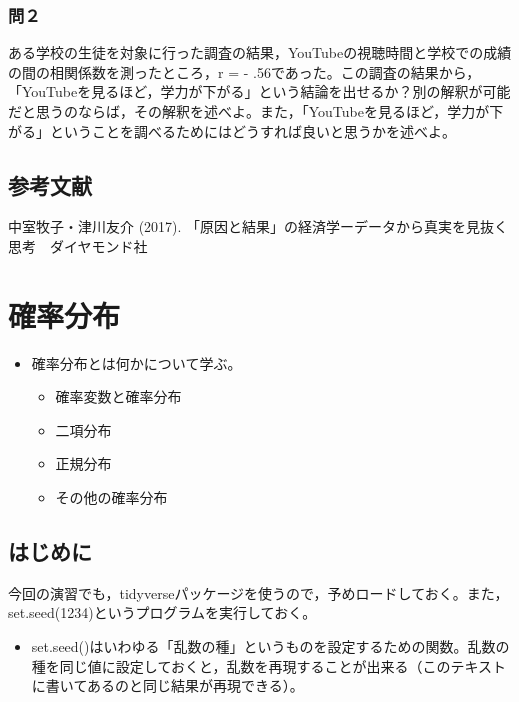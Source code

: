 \documentclass[]{article}
\providecommand{\tightlist}{%
  \setlength{\itemsep}{0pt}\setlength{\parskip}{0pt}}
\begin{document}
\subsubsection{問２}\label{-7}

ある学校の生徒を対象に行った調査の結果，YouTubeの視聴時間と学校での成績の間の相関係数を測ったところ，r
= -
.56であった。この調査の結果から，「YouTubeを見るほど，学力が下がる」という結論を出せるか？別の解釈が可能だと思うのならば，その解釈を述べよ。また，「YouTubeを見るほど，学力が下がる」ということを調べるためにはどうすれば良いと思うかを述べよ。

\subsection{参考文献}

中室牧子・津川友介 (2017).
「原因と結果」の経済学ーデータから真実を見抜く思考　ダイヤモンド社

\section{確率分布}

\begin{itemize}
\tightlist
\item
  確率分布とは何かについて学ぶ。

  \begin{itemize}
  \tightlist
  \item
    確率変数と確率分布
  \item
    二項分布
  \item
    正規分布
  \item
    その他の確率分布
  \end{itemize}
\end{itemize}

\subsection{はじめに}\label{-1}

今回の演習でも，tidyverseパッケージを使うので，予めロードしておく。また，set.seed(1234)というプログラムを実行しておく。

\begin{itemize}
\tightlist
\item
  set.seed()はいわゆる「乱数の種」というものを設定するための関数。乱数の種を同じ値に設定しておくと，乱数を再現することが出来る（このテキストに書いてあるのと同じ結果が再現できる）。
\end{itemize}
\end{document}
